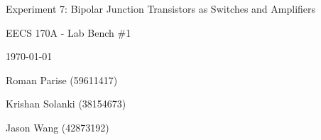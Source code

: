 \newcommand{\expnum}{7: Bipolar Junction Transistors as Switches and Amplifiers}

\begin{titlepage}
	\centering
	\vspace{2.5cm}
	{\huge Experiment \expnum \par}
	\vspace{1cm}
	{\Large EECS 170A - Lab Bench \#1 \par}
	{\Large \today \par}
	\vspace{1cm}
	{\large Roman Parise (59611417) \par}
	{\large Krishan Solanki (38154673) \par}
	{\large Jason Wang (42873192) \par}
	\vspace{1cm}
\end{titlepage}



